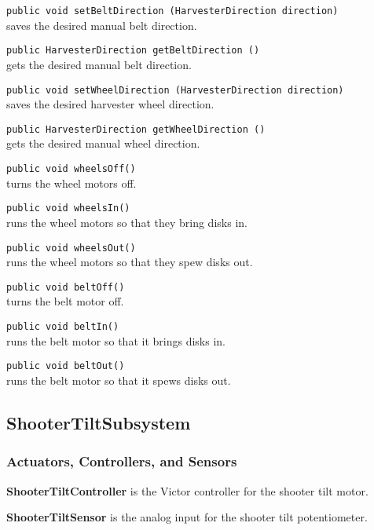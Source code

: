 \documentclass[]{article}
\begin{document}
\noindent
\lstinline[]|public void setBeltDirection (HarvesterDirection direction)| \\
saves the desired manual belt direction.

\noindent
\lstinline[]|public HarvesterDirection getBeltDirection ()| \\
gets the desired manual belt direction.

\noindent
\lstinline[]|public void setWheelDirection (HarvesterDirection direction)| \\
saves the desired harvester wheel direction.

\noindent
\lstinline[]|public HarvesterDirection getWheelDirection ()| \\
gets the desired manual wheel direction.

\noindent
\lstinline[]|public void wheelsOff()| \\
turns the wheel motors off.

\noindent
\lstinline[]|public void wheelsIn()| \\
runs the wheel motors so that they bring disks in.

\noindent
\lstinline[]|public void wheelsOut()| \\
runs the wheel motors so that they spew disks out.

\noindent
\lstinline[]|public void beltOff()| \\
turns the belt motor off.

\noindent
\lstinline[]|public void beltIn()| \\
runs the belt motor so that it brings disks in.

\noindent
\lstinline[]|public void beltOut()| \\
runs the belt motor so that it spews disks out.

\subsection{ShooterTiltSubsystem}

\subsubsection{Actuators, Controllers, and Sensors}

\textbf{ShooterTiltController} is the Victor controller for the shooter tilt motor.

\textbf{ShooterTiltSensor} is the analog input for the shooter tilt potentiometer.
\end{document}
